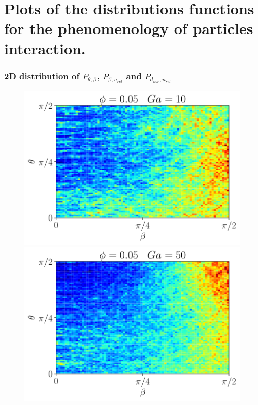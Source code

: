 \chapter{Plots of the distributions functions for the phenomenology of particles interaction.}
\label{ap:dist}

\subsection*{2D distribution of $P_{\theta,\beta}$, $P_{\beta,u_{rel}}$ and  $P_{d_{nbr},u_{rel}}$}
\label{sec:dist_beta_theta}

\begin{figure}[h!]
    \centering
    \includegraphics[height =\size]{image/N_10/beta/2DMAP_beta_theta_dmin_10_Bo0_5PHI0_05mu_r0_042Ga10.pdf}
    \includegraphics[height =\size]{image/N_10/beta/2DMAP_beta_theta_dmin_10_Bo0_5PHI0_05mu_r0_042Ga50.pdf}

\end{figure}
